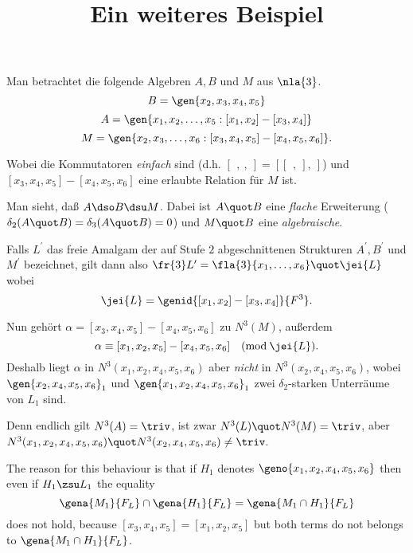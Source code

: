 \documentclass[english,german,11pt]{article}
\title{Ein weiteres Beispiel}
\author{}
\date{}
\begin{document}
\maketitle
Man betrachtet die folgende Algebren $A,B$ und $M$ aus $\nla{3}$.
$$B=\gen{x_{2},x_{3},x_{4},x_{5}}$$
$$A=\gen{x_{1},x_{2},\dots,x_{5}:[x_{1},x_{2}]-[x_{3},x_{4}]}$$
$$M=\gen{x_{2},x_{3},\dots,x_{6}:[x_{3},x_{4},x_{5}]-[x_{4},x_{5},x_{6}]}.$$

Wobei die Kommutatoren \emph{einfach} sind (d.h. $[\,\:,\:,\:]=[[\,\:,\:],\:]$) und
$[x_{3},x_{4},x_{5}]-[x_{4},x_{5},x_{6}]$ eine erlaubte Relation f\"ur $M$ ist.

\smallskip
Man sieht, da{\ss} $A\dso B\dsu M$. Dabei ist $A\quot B$ eine \emph{flache} Erweiterung
($\delta_{2}(A\quot B)=\delta_{3}(A\quot B)=0$) und
$M\quot B$ eine \emph{algebraische}.

\smallskip
Falls $L^{\prime}$ das freie Amalgam der auf Stufe $2$ abgeschnittenen Strukturen $A^{\prime},B^{\prime}$ und $M^{\prime}$ bezeichnet, gilt dann also $\fr{3}L^{\prime}=\fla{3}{x_{1},\dots,x_{6}}\quot\jei{L}$ wobei
$$\jei{L}=\genid{[x_{1},x_{2}]-[x_{3},x_{4}]}{F^{3}}.$$

Nun geh\"ort $\alpha=[x_{3},x_{4},x_{5}]-[x_{4},x_{5},x_{6}]$ zu $N^{3}(M)$, au{\ss}erdem
$$\alpha\equiv[x_{1},x_{2},x_{5}]-[x_{4},x_{5},x_{6}]\quad(\text{mod}\:\jei{L}).$$
Deshalb liegt $\alpha$ in $N^{3}(x_{1},x_{2},x_{4},x_{5},x_{6})$ aber {\sl nicht} in $N^{3}(x_{2},x_{4},x_{5},x_{6})$,
wobei $\gen{x_{2},x_{4},x_{5},x_{6}}_{1}$ und $\gen{x_{1},x_{2},x_{4},x_{5},x_{6}}_{1}$ zwei
$\delta_{2}$-starken Unterr\"aume von $L_{1}$ sind.

Denn endlich gilt $N^{3}(A)=\triv$, ist zwar $N^{3}(L)\quot N^{3}(M)=\triv$, aber $N^{3}(x_{1},x_{2},x_{4},x_{5},x_{6})\quot N^{3}(x_{2},x_{4},x_{5},x_{6})\neq\triv$.

\medskip
The reason for this behaviour is that if $H_{1}$ denotes $\geno{x_{1},x_{2},x_{4},x_{5},x_{6}}$
then even if $H_{1}\zsu L_{1}$ the equality
$$
\gena{M_{1}}{F_L}\cap\gena{H_{1}}{F_L}=\gena{M_{1}\cap H_{1}}{F_L}
$$
does not hold, because $[x_{3},x_{4},x_{5}]=[x_{1},x_{2},x_{5}]$ but both terms
do not belongs to $\gena{M_{1}\cap H_{1}}{F_L}$.
\end{document}

